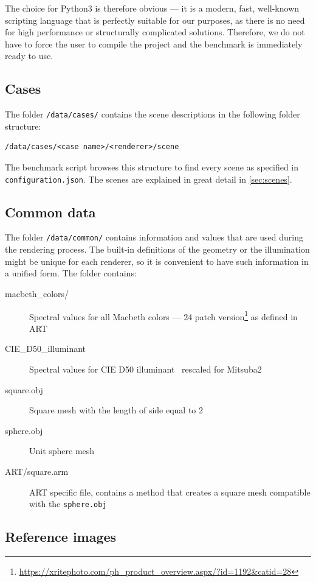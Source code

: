 The choice for Python3 is therefore obvious --- it is a modern, fast, well-known scripting language that is perfectly suitable for our purposes, as there is no need for high performance or structurally complicated solutions. Therefore, we do not have to force the user to compile the project and the benchmark is immediately ready to use.

\subsection{Cases}

The folder \texttt{/data/cases/} contains the scene descriptions in the following folder structure:

\begin{lstlisting}
/data/cases/<case name>/<renderer>/scene
\end{lstlisting}

The benchmark script browses this structure to find every scene as specified in \texttt{configuration.json}. The scenes are explained in great detail in \autoref{sec:scenes}.

\subsection{Common data}

The folder \texttt{/data/common/} contains information and values that are used during the rendering process. The built-in definitions of the geometry or the illumination might be unique for each renderer, so it is convenient to have such information in a unified form. The folder contains:

\begin{description}
	\item[macbeth\_colors/] Spectral values for all Macbeth colors --- 24 patch version\footnote{\url{https://xritephoto.com/ph_product_overview.aspx/?id=1192&catid=28}} as defined in ART
	\item[CIE\_D50\_illuminant] Spectral values for CIE D50 illuminant~\cite{cieData} rescaled for Mitsuba2
	\item[square.obj] Square mesh with the length of side equal to 2
	\item[sphere.obj] Unit sphere mesh
	\item[ART/square.arm] ART specific file, contains a method that creates a square mesh compatible with the \texttt{sphere.obj}
\end{description}

\subsection{Reference images}

